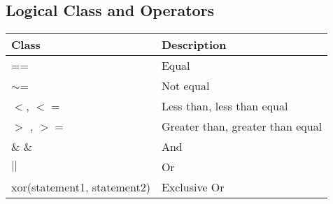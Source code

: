 \documentclass[12pt]{article}
\begin{document}
\subsection{Logical Class and Operators}
\begin{tabular}{|l|l|}
	\hline
	Class & Description\\ \hline
	== & Equal\\
	$\mathtt{\sim}$= & Not equal\\
	$<$, $<=$ & Less than, less than equal\\
	$>$ , $>=$ & Greater than, greater than equal\\
	\& \& & And\\
	$||$ & Or\\
	xor(statement1, statement2) & Exclusive Or\\


	\hline
\end{tabular}
\end{document}

